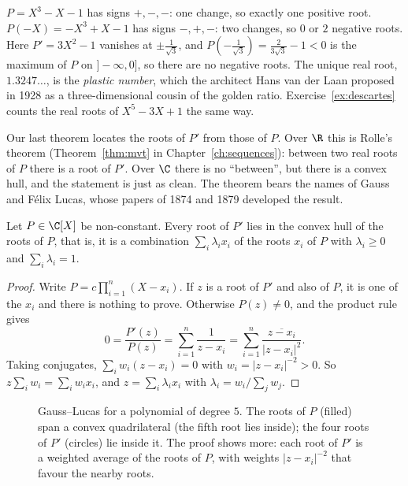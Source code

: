 \begin{examplex}
$P=X^3-X-1$ has signs $+,-,-$: one change, so exactly one positive root. $P(-X)=-X^3+X-1$ has signs $-,+,-$: two changes, so $0$ or $2$ negative
roots. Here $P'=3X^2-1$ vanishes at $\pm\frac1{\sqrt3}$, and $P(-\frac1{\sqrt3})=\frac2{3\sqrt3}-1<0$ is the maximum of $P$ on $]-\infty,0]$, so
there are no negative roots. The unique real root, $1.3247\ldots$, is the \emph{plastic number}, which the architect Hans van der Laan proposed in
1928 as a three-dimensional cousin of the golden ratio. Exercise~\ref{ex:descartes} counts the real roots of $X^5-3X+1$ the same way.
\end{examplex}

Our last theorem locates the roots of $P'$ from those of $P$. Over $\R$ this is Rolle's theorem (Theorem~\ref{thm:mvt} in Chapter~\ref{ch:sequences}): between two real roots of $P$ there is
a root of $P'$. Over $\C$ there is no ``between'', but there is a convex hull, and the statement is just as clean. The theorem bears the names of Gauss and
F\'elix Lucas, whose papers of 1874 and 1879 developed the result.

\begin{theorem}\label{thm:gausslucas}
Let $P\in\C[X]$ be non-constant. Every root of $P'$ lies in the convex hull of the roots of $P$, that is, it is a combination
$\sum_i\lambda_ix_i$ of the roots $x_i$ of $P$ with $\lambda_i\ge0$ and $\sum_i\lambda_i=1$.
\end{theorem}
\begin{proof}
Write $P=c\prod_{i=1}^n(X-x_i)$. If $z$ is a root of $P'$ and also of $P$, it is one of the $x_i$ and there is nothing to prove. Otherwise $P(z)\ne0$,
and the product rule gives
\[
0=\frac{P'(z)}{P(z)}=\sum_{i=1}^n\frac1{z-x_i}=\sum_{i=1}^n\frac{\overline{z-x_i}}{|z-x_i|^2}.
\]
Taking conjugates, $\sum_iw_i(z-x_i)=0$ with $w_i=|z-x_i|^{-2}>0$. So $z\sum_iw_i=\sum_iw_ix_i$, and $z=\sum_i\lambda_ix_i$ with
$\lambda_i=w_i/\sum_jw_j$.
\end{proof}

\begin{figure}[ht]
\centering
{}
\caption{Gauss--Lucas for a polynomial of degree $5$. The roots of $P$ (filled) span a convex quadrilateral (the fifth root lies inside); the four roots of $P'$ (circles) lie inside it. The proof shows more: each root of $P'$ is a weighted average of the roots of $P$, with weights $|z-x_i|^{-2}$ that favour the nearby roots.}
\label{fig:gausslucas}
\end{figure}

